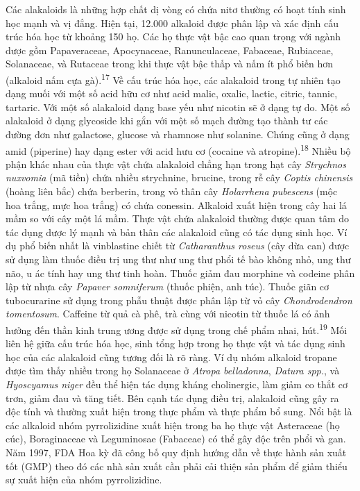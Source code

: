 \documentclass[
  letterpaper,
  DIV=11,
  numbers=noendperiod]{scrartcl}
\begin{document}
Các alakaloids là những hợp chất dị vòng có chứa nitơ thường có hoạt
tính sinh học mạnh và vị đắng. Hiện tại, 12.000 alkaloid được phân lập
và xác định cấu trúc hóa học từ khoảng 150 họ. Các họ thực vật bậc cao
quan trọng với ngành dược gồm Papaveraceae, Apocynaceae, Ranunculaceae,
Fabaceae, Rubiaceae, Solanaceae, và Rutaceae trong khi thực vật bậc thấp
và nấm ít phổ biến hơn (alkaloid nấm cựa gà).\textsuperscript{17} Về cấu
trúc hóa học, các alakaloid trong tự nhiên tạo dạng muối với một số acid
hữu cơ như acid malic, oxalic, lactic, citric, tannic, tartaric. Với một
số alakaloid dạng base yếu như nicotin sẽ ở dạng tự do. Một số alakaloid
ở dạng glycoside khi gắn với một số mạch đường tạo thành tư các đường
đơn như galactose, glucose và rhamnose như solanine. Chúng cũng ở dạng
amid (piperine) hay dạng ester với acid hưu cơ (cocaine và
atropine).\textsuperscript{18} Nhiều bộ phận khác nhau của thực vật chứa
alakaloid chẳng hạn trong hạt cây \emph{Strychnos nuxvomia} (mã tiền)
chứa nhiều strychnine, brucine, trong rễ cây \emph{Coptis chinensis}
(hoàng liên bắc) chứa berberin, trong vỏ thân cây \emph{Holarrhena
pubescens} (mộc hoa trắng, mực hoa trắng) có chứa conessin. Alkaloid
xuất hiện trong cây hai lá mầm so với cây một lá mầm. Thực vật chứa
alakaloid thường được quan tâm do tác dụng dược lý mạnh và bản thân các
alakaloid cũng có tác dụng sinh học. Ví dụ phổ biến nhất là vinblastine
chiết từ \emph{Catharanthus roseus} (cây dừa can) được sử dụng làm thuốc
điều trị ung thư như ung thư phổi tế bào không nhỏ, ung thư não, u ác
tính hay ung thư tinh hoàn. Thuốc giảm đau morphine và codeine phân lập
từ nhựa cây \emph{Papaver somniferum} (thuốc phiện, anh túc). Thuốc giãn
cơ tubocurarine sử dụng trong phẫu thuật được phân lập từ vỏ cây
\emph{Chondrodendron tomentosum}. Caffeine từ quả cà phê, trà cùng với
nicotin từ thuốc lá có ảnh hưởng đến thần kinh trung ương được sử dụng
trong chế phẩm nhai, hút.\textsuperscript{19} Mối liên hệ giữa cấu trúc
hóa học, sinh tổng hợp trong họ thực vật và tác dụng sinh học của các
alakaloid cũng tương đối là rõ ràng. Ví dụ nhóm alkaloid tropane được
tìm thấy nhiều trong họ Solanaceae ở \emph{Atropa belladonna},
\emph{Datura spp.}, và \emph{Hyoscyamus niger} đều thể hiện tác dụng
kháng cholinergic, làm giảm co thắt cơ trơn, giảm đau và tăng tiết. Bên
cạnh tác dụng điều trị, alakaloid cũng gây ra độc tính và thường xuất
hiện trong thực phẩm và thực phẩm bổ sung. Nổi bật là các alkaloid nhóm
pyrrolizidine xuất hiện trong ba họ thực vật Asteraceae (họ cúc),
Boraginaceae và Leguminosae (Fabaceae) có thể gây độc trên phổi và gan.
Năm 1997, FDA Hoa kỳ đã công bố quy định hướng dẫn về thực hành sản xuất
tốt (GMP) theo đó các nhà sản xuất cần phải cải thiện sản phẩm để giảm
thiểu sự xuất hiện của nhóm pyrrolizidine.
\end{document}
